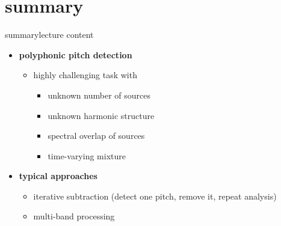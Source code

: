     \section{summary}
        \begin{frame}{summary}{lecture content}
            \begin{itemize}
                \item   \textbf{polyphonic pitch detection}
                    \begin{itemize}
                        \item   highly challenging task with
                            \begin{itemize}
                                \item   unknown number of sources
                                \item   unknown harmonic structure
                                \item   spectral overlap of sources
                                \item   time-varying mixture
                            \end{itemize}
                    \end{itemize}
                \bigskip
                \item   \textbf{typical approaches}
                    \begin{itemize}
                        \item   iterative subtraction (detect one pitch, remove it, repeat analysis)
                        \item   multi-band processing
                    \end{itemize}
            \end{itemize}
        \end{frame}

